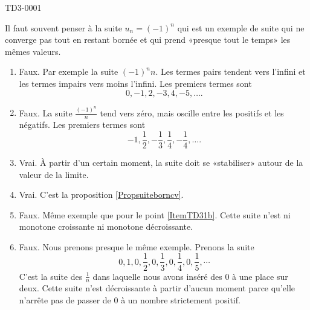 
\begin{corrige}{TD3-0001}

	Il faut souvent penser à la suite $u_n=(-1)^n$ qui est un exemple de suite qui ne converge pas tout en restant bornée et qui prend «presque tout le temps» les mêmes valeurs.

	\begin{enumerate}
		\item
			Faux. Par exemple la suite $(-1)^nn$. Les termes pairs tendent vers l'infini et les termes impairs vers moins l'infini. Les premiers termes sont
			\begin{equation}
				0,-1,2,-3,4,-5,\ldots.
			\end{equation}
		\item\label{ItemTD31b}
			Faux. La suite $\frac{ (-1)^n }{ n }$ tend vers zéro, mais oscille entre les positifs et les négatifs. Les premiers termes sont
			\begin{equation}
				-1,\frac{ 1 }{ 2 },-\frac{ 1 }{ 3 },\frac{1}{ 4 },-\frac{1}{ 4 },\ldots.
			\end{equation}
		\item
			Vrai. À partir d'un certain moment, la suite doit se «stabiliser» autour de la valeur de la limite.
		\item
			Vrai. C'est la proposition \ref{Propsuiteborncv}.
		\item
			Faux. Même exemple que pour le point \ref{ItemTD31b}. Cette suite n'est ni monotone croissante ni monotone décroissante.
		\item
			Faux. Nous prenons presque le même exemple. Prenons la suite
			\begin{equation}
				0,1,0,\frac{ 1 }{2},0,\frac{ 1 }{3},0,\frac{1}{ 4 },0,\frac{1}{ 5 },\cdots
			\end{equation}
			C'est la suite des $\frac{1}{ n }$ dans laquelle nous avons inséré des $0$ à une place sur deux. Cette suite n'est décroissante à partir d'aucun moment parce qu'elle n'arrête pas de passer de $0$ à un nombre strictement positif.


\end{enumerate}
\end{corrige}
